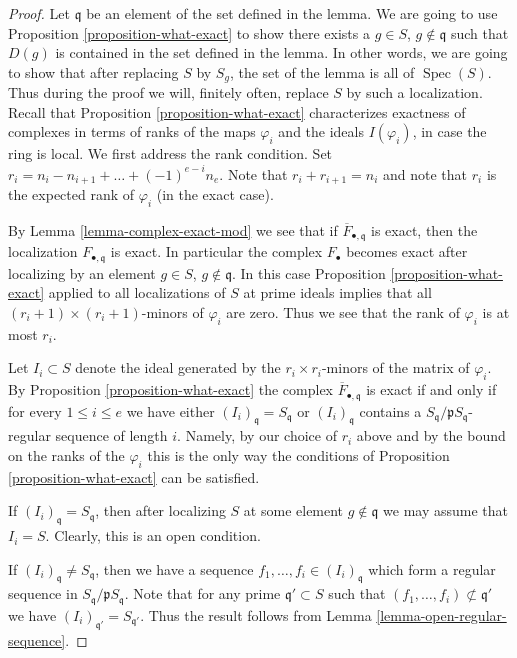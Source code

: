 \documentclass[10pt,a4paper]{amsart}
\theoremstyle{plain}
\theoremstyle{definition}
\theoremstyle{remark}
\numberwithin{equation}{subsection}
\def\Spec{\mathop{\mathrm{Spec}}}
\begin{document}
\begin{proof}
Let $\mathfrak q$ be an element of the set defined in the lemma.
We are going to use Proposition \ref{proposition-what-exact}
to show there exists a $g \in S$, $g \not \in \mathfrak q$
such that $D(g)$ is contained in the set defined in the lemma.
In other words, we are going to show that after replacing $S$
by $S_g$, the set of the lemma is all of $\Spec(S)$.
Thus during the proof we will, finitely often, replace
$S$ by such a localization.
Recall that Proposition \ref{proposition-what-exact}
characterizes exactness of complexes
in terms of ranks of the maps $\varphi_i$ and the ideals
$I(\varphi_i)$, in case the ring is local. We first address
the rank condition. Set
$r_i = n_i - n_{i + 1} + \ldots + (-1)^{e - i} n_e$.
Note that $r_i + r_{i + 1} = n_i$ and note that
$r_i$ is the expected rank of $\varphi_i$ (in the
exact case).

\medskip\noindent
By Lemma \ref{lemma-complex-exact-mod} we see that if
$\overline{F}_{\bullet, \mathfrak q}$ is exact, then
the localization $F_{\bullet, \mathfrak q}$ is exact.
In particular the complex $F_\bullet$ becomes
exact after localizing by an element
$g \in S$, $g \not \in \mathfrak q$. In this case
Proposition \ref{proposition-what-exact} applied
to all localizations of $S$ at prime ideals
implies that all $(r_i + 1) \times (r_i + 1)$-minors
of $\varphi_i$ are zero. Thus we see that the rank
of $\varphi_i$ is at most $r_i$.

\medskip\noindent
Let $I_i \subset S$ denote the ideal generated
by the $r_i \times r_i$-minors of the matrix
of $\varphi_i$. By Proposition \ref{proposition-what-exact}
the complex $\overline{F}_{\bullet, \mathfrak q}$ is exact
if and only if for every $1 \leq i \leq e$ we have
either $(I_i)_{\mathfrak q} = S_{\mathfrak q}$ or
$(I_i)_{\mathfrak q}$ contains a $S_{\mathfrak q}/\mathfrak p
S_{\mathfrak q}$-regular sequence of length $i$.
Namely, by our choice of $r_i$ above and by the
bound on the ranks of the $\varphi_i$ this is the
only way the conditions of Proposition \ref{proposition-what-exact}
can be satisfied.

\medskip\noindent
If $(I_i)_{\mathfrak q} = S_{\mathfrak q}$, then after localizing $S$ at
some element $g \not\in \mathfrak q$ we may assume that
$I_i = S$. Clearly, this is an open condition.

\medskip\noindent
If $(I_i)_{\mathfrak q} \not = S_{\mathfrak q}$, then we have
a sequence $f_1, \ldots, f_i \in (I_i)_{\mathfrak q}$ which
form a regular sequence in $S_{\mathfrak q}/\mathfrak pS_{\mathfrak q}$.
Note that for any prime $\mathfrak q' \subset S$ such that
$(f_1, \ldots, f_i) \not \subset \mathfrak q'$ we have
$(I_i)_{\mathfrak q'} = S_{\mathfrak q'}$.
Thus the result follows from Lemma \ref{lemma-open-regular-sequence}.
\end{proof}
\end{document}
